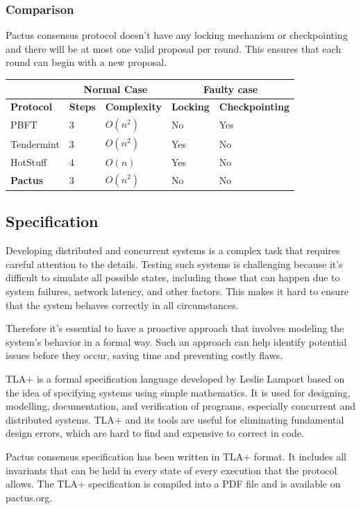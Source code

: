 \documentclass{novel}
\begin{document}
\subsubsection{Comparison}
Pactus consensus protocol doesn’t have any locking mechanism or checkpointing and there will be at most one valid proposal per round. This ensures that each round can begin with a new proposal.

\begin{tabular}{|p{1.8cm}|p{1cm}|p{2.5cm}|p{2cm}|p{3cm}|  }
 \hline
 & \multicolumn{2}{c|}{\textbf{Normal Case}}&\multicolumn{2}{|c|}{\textbf{Faulty case}}\\
 \hline
 \textbf{Protocol} & \textbf{Steps} & \textbf{Complexity} & \textbf{Locking} & \textbf{Checkpointing} \\
 \hline
 PBFT & 3 & $O(n^2)$ & No & Yes \\
 \hline
 Tendermint & 3 & $O(n^2)$ & Yes & No \\
 \hline
 HotStuff & 4 & $O(n)$ & Yes & No \\
 \hline
 \textbf{Pactus} & 3 & $O(n^2)$ & No & No \\
 \hline
\end{tabular}

\subsection{Specification}
Developing distributed and concurrent systems is a complex task that requires careful attention to the details. Testing such systems is challenging because it’s difficult to simulate all possible states, including those that can happen due to system failures, network latency, and other factors. This makes it hard to ensure that the system behaves correctly in all circumstances.

Therefore it’s essential to have a proactive approach that involves modeling the system’s behavior in a formal way. Such an approach can help identify potential issues before they occur, saving time and preventing costly flaws.

TLA+ is a formal specification language developed by Leslie Lamport based on the idea of specifying systems using simple mathematics. It is used for designing, modelling, documentation, and verification of programs, especially concurrent and distributed systems. TLA+ and its tools are useful for eliminating fundamental design errors, which are hard to find and expensive to correct in code.

Pactus consensus specification has been written in TLA+ format. It includes all invariants that can be held in every state of every execution that the protocol allows. The TLA+ specification is compiled into a PDF file and is available on pactus.org.
\end{document}
